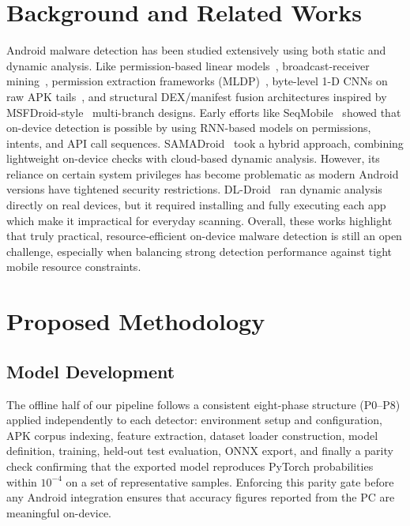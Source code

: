 \documentclass[conference]{IEEEtran}
\begin{document}
	\section{Background and Related Works}
	Android malware detection has been studied extensively using both static and dynamic analysis. Like permission-based linear models~\cite{linregdroid}, broadcast-receiver mining~\cite{broadcast}, permission extraction frameworks (MLDP)~\cite{mldp}, byte-level 1-D CNNs on raw APK tails~\cite{bytecnn}, and structural DEX/manifest fusion architectures inspired by MSFDroid-style~\cite{msfdroid} multi-branch designs. Early efforts like SeqMobile ~\cite{seqmobile}showed that on-device detection is possible by using RNN-based models on permissions, intents, and API call sequences. SAMADroid~\cite{samadroid} took a hybrid approach, combining lightweight on-device checks with cloud-based dynamic analysis. However, its reliance on certain system privileges has become problematic as modern Android versions have tightened security restrictions. DL-Droid~\cite{dldroid} ran dynamic analysis directly on real devices, but it required installing and fully executing each app which make it impractical for everyday scanning.
	Overall, these works highlight that truly practical, resource-efficient on-device malware detection is still an open challenge, especially when balancing strong detection performance against tight mobile resource constraints.
	
	
	
	
	\section{Proposed Methodology}
	
	\subsection{ Model Development }
	
	The offline half of our pipeline follows a consistent eight-phase structure (P0--P8) applied independently to each detector: environment setup and configuration, APK corpus indexing, feature extraction, dataset loader construction, model definition, training, held-out test evaluation, ONNX export, and finally a parity check confirming that the exported model reproduces PyTorch probabilities within $10^{-4}$ on a set of representative samples. Enforcing this parity gate before any Android integration ensures that accuracy figures reported from the PC are meaningful on-device.
	
\end{document}
